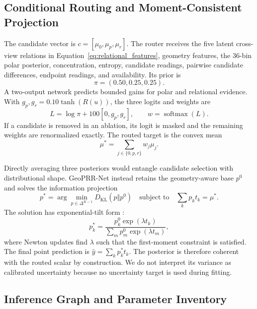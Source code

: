 \documentclass[electronics,article,submit,oneauthor]{Definitions/mdpi}
\newcommand{\modelname}{GeoPRR-Net\xspace}
\begin{document}
\subsection{Conditional Routing and Moment-Consistent Projection}
\label{subsec:routing}

The candidate vector is $c=[\mu_0,\mu_p,\mu_r]$. The router receives the five latent cross-view relations in Equation~\eqref{eq:relational_features}, geometry features, the 36-bin polar posterior, concentration, entropy, candidate readings, pairwise candidate differences, endpoint readings, and availability. Its prior is
\begin{equation}
\pi=(0.50,0.25,0.25).
\label{eq:prior}
\end{equation}
A two-output network predicts bounded gains for polar and relational evidence. With $g_p,g_r=0.10\tanh(R(u))$, the three logits and weights are
\begin{equation}
L=\log\pi+100[0,g_p,g_r],\qquad w=\operatorname{softmax}(L).
\label{eq:router}
\end{equation}
If a candidate is removed in an ablation, its logit is masked and the remaining weights are renormalized exactly. The routed target is the convex mean
\begin{equation}
\mu^*=\sum_{j\in\{0,p,r\}}w_j\mu_j.
\label{eq:routed_mean}
\end{equation}

Directly averaging three posteriors would entangle candidate selection with distributional shape. \modelname instead retains the geometry-aware base $p^0$ and solves the information projection
\begin{equation}
p^*=\arg\min_{p\in\Delta^{K-1}}D_{\mathrm{KL}}(p\Vert p^0)
\quad\text{subject to}\quad \sum_k p_kt_k=\mu^*.
\label{eq:iprojection}
\end{equation}
The solution has exponential-tilt form \cite{csiszar1975idivergence}:
\begin{equation}
p_k^*=\frac{p_k^0\exp(\lambda t_k)}{\sum_m p_m^0\exp(\lambda t_m)},
\label{eq:tilt}
\end{equation}
where Newton updates find $\lambda$ such that the first-moment constraint is satisfied. The final point prediction is $\widehat{y}=\sum_kp_k^*t_k$. The posterior is therefore coherent with the routed scalar by construction. We do not interpret its variance as calibrated uncertainty because no uncertainty target is used during fitting.

\subsection{Inference Graph and Parameter Inventory}
\label{subsec:inventory}
\end{document}
